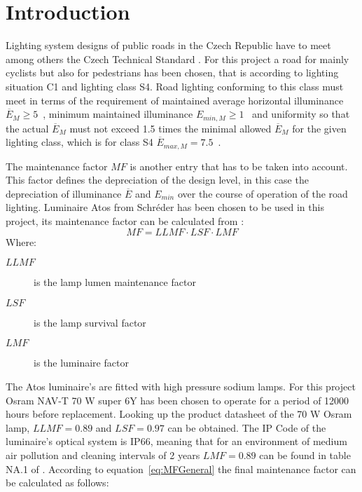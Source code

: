 \section{Introduction}
\label{sec:Road_Lighting_Design}
Lighting system designs of public roads in the Czech Republic have to meet among others the Czech Technical Standard \cite{CSN_EN_13201-2}. For this project a road for mainly cyclists but also for pedestrians has been chosen, that is according to \cite{CSN_EN_13201-1} lighting situation C1 and lighting class S4. Road lighting conforming to this class must meet in terms of \cite{CSN_EN_13201-2} the requirement of maintained average horizontal illuminance $\overline{E}_{M}\geq 5$~, minimum maintained illuminance $E_{min,M}\geq 1$~ and uniformity so that the actual $\overline{E}_{M}$ must not exceed 1.5 times the minimal allowed $\overline{E}_{M}$ for the given lighting class, which is for class S4 $\overline{E}_{max,M} = 7.5$~.

The maintenance factor $MF$ is another entry that has to be taken into account. This factor defines the depreciation of the design level, in this case the depreciation of illuminance $\overline{E}$ and $E_{min}$ over the course of operation of the road lighting. Luminaire Atos from Schr\'{e}der has been chosen to be used in this project, its maintenance factor can be calculated from \cite{CSN_EN_13201-2_Z1}:
\begin{equation}
\label{eq:MFGeneral}
MF = LLMF \cdot LSF \cdot LMF
\end{equation}
Where:
\begin{description}
	\item[$LLMF$] is the lamp lumen maintenance factor
	\item[$LSF$] is the lamp survival factor
	\item[$LMF$] is the luminaire factor
\end{description}

The Atos luminaire's are fitted with high pressure sodium lamps. For this project Osram NAV-T 70 W super 6Y has been chosen to operate for a period of 12000 hours before replacement. Looking up the product datasheet \cite{Osram} of the 70 W Osram lamp, $LLMF=0.89$ and $LSF=0.97$ can be obtained. The IP Code of the luminaire's optical system is IP66, meaning that for an environment of medium air pollution and cleaning intervals of 2 years $LMF=0.89$ can be found in table NA.1 of \cite{CSN_EN_13201-2_Z1}. According to equation~\ref{eq:MFGeneral} the final maintenance factor can be calculated as follows:

